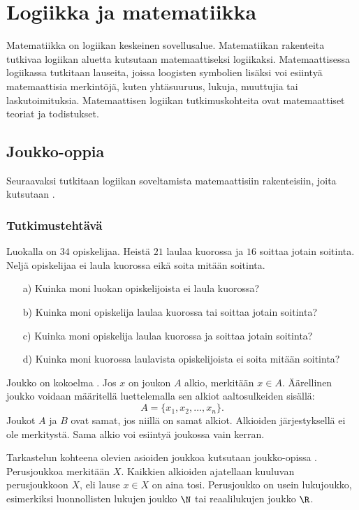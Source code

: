 \chapter{Logiikka ja matematiikka}

Matematiikka on logiikan keskeinen sovellusalue. Matematiikan rakenteita tutkivaa logiikan aluetta kutsutaan matemaattiseksi logiikaksi. Matemaattisessa logiikassa tutkitaan lauseita, joissa loogisten symbolien lisäksi voi esiintyä matemaattisia merkintöjä, kuten yhtäsuuruus, lukuja, muuttujia tai laskutoimituksia. Matemaattisen logiikan tutkimuskohteita ovat matemaattiset teoriat ja todistukset.


\section{Joukko-oppia}%
Seuraavaksi tutkitaan logiikan soveltamista matemaattisiin rakenteisiin, joita kutsutaan .

\subsection*{Tutkimustehtävä}
Luokalla on $34$ opiskelijaa. Heistä $21$ laulaa kuorossa ja $16$ soittaa jotain soitinta. Neljä opiskelijaa ei laula kuorossa eikä soita mitään soitinta.
\begin{itemize}
\item[a)] Kuinka moni luokan opiskelijoista ei laula kuorossa?
\item[b)] Kuinka moni opiskelija laulaa kuorossa tai soittaa jotain soitinta?
\item[c)] Kuinka moni opiskelija laulaa kuorossa ja soittaa jotain soitinta?
\item[d)] Kuinka moni kuorossa laulavista opiskelijoista ei soita mitään soitinta?
\end{itemize}

Joukko on kokoelma . Jos $x$ on joukon $A$ alkio, merkitään $x\in A$. Äärellinen joukko voidaan määritellä luettelemalla sen alkiot aaltosulkeiden sisällä:
\[
 A = \{ x_1,x_2,\ldots,x_n\}.
\]
Joukot $A$ ja $B$ ovat samat, jos niillä on samat alkiot. Alkioiden jär\-jes\-tyk\-sel\-lä ei ole merkitystä. Sama alkio voi esiintyä joukossa vain kerran.

Tarkastelun kohteena olevien asioiden joukkoa kutsutaan joukko-opissa . Perusjoukkoa merkitään $X$. Kaikkien alkioiden ajatellaan kuuluvan perusjoukkoon $X$, eli lause $x\in X$ on aina tosi. Perusjoukko on usein lukujoukko, esimerkiksi luonnollisten lukujen joukko $\N$ tai reaalilukujen joukko $\R$.

